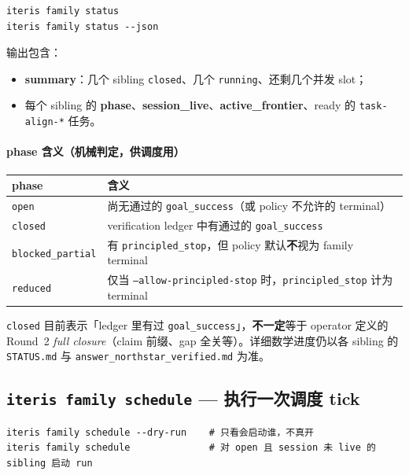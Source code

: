 \documentclass[11pt,a4paper]{ctexart}
\begin{document}
\begin{lstlisting}[style=shell]
iteris family status
iteris family status --json
\end{lstlisting}

输出包含：
\begin{itemize}[nosep]
  \item \textbf{summary}：几个 sibling \texttt{closed}、几个 \texttt{running}、还剩几个并发 slot；
  \item 每个 sibling 的 \textbf{phase}、\textbf{session\_live}、\textbf{active\_frontier}、ready 的 \texttt{task-align-*} 任务。
\end{itemize}

\paragraph{phase 含义（机械判定，供调度用）}
\begin{center}
\begin{tabular}{lp{9cm}}
\toprule
phase & 含义 \\
\midrule
\texttt{open} & 尚无通过的 \texttt{goal\_success}（或 policy 不允许的 terminal） \\
\texttt{closed} & verification ledger 中有通过的 \texttt{goal\_success} \\
\texttt{blocked\_partial} & 有 \texttt{principled\_stop}，但 policy 默认\textbf{不}视为 family terminal \\
\texttt{reduced} & 仅当 \texttt{--allow-principled-stop} 时，\texttt{principled\_stop} 计为 terminal \\
\bottomrule
\end{tabular}
\end{center}

\begin{remark}
\texttt{closed} 目前表示「ledger 里有过 \texttt{goal\_success}」，\textbf{不一定}等于 operator 定义的 Round~2 \emph{full closure}（claim 前缀、gap 全关等）。详细数学进度仍以各 sibling 的 \texttt{STATUS.md} 与 \texttt{answer\_northstar\_verified.md} 为准。
\end{remark}

\subsection{\texttt{iteris family schedule} — 执行一次调度 tick}

\begin{lstlisting}[style=shell]
iteris family schedule --dry-run    # 只看会启动谁，不真开
iteris family schedule              # 对 open 且 session 未 live 的 sibling 启动 run
\end{lstlisting}
\end{document}
